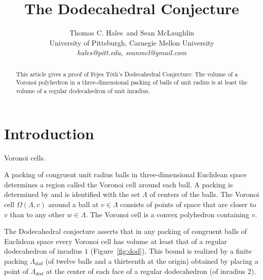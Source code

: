 \documentclass{article} %
\begin{document}
\title{The Dodecahedral Conjecture}
\author{Thomas C. Hales\ and Sean McLaughlin \\
        \normalsize{University of Pittsburgh, Carnegie Mellon University} \\
        \normalsize{\it{hales@pitt.edu, seanmcl@gmail.com}}}
\date{}
\maketitle

\begin{abstract}  
This article gives a proof of Fejes T\'oth's Dodecahedral Conjecture:
The volume of a Voronoi polyhedron in a three-dimensional packing of
balls of unit radius is at least the volume of a regular dodecahedron
of unit inradius.
\end{abstract}


\section{Introduction}

\begin{floatingfigure}{55mm}
  \begin{center}
   \end{center}
  \caption{Voronoi cells.}
  \label{fig:voronoi}
\end{floatingfigure}

A packing of congruent unit radius balls in three-dimensional
Euclidean space determines a region called the Voronoi cell around
each ball. A packing is determined by and is identified with the set
$\Lambda$ of centers of the balls. The Voronoi cell
$\Omega(\Lambda,v)$ around a ball at $v\in \Lambda$ consists of points
of space that are closer to $v$ than to any other $w\in\Lambda$. The
Voronoi cell is a convex polyhedron containing $v$.

The Dodecahedral conjecture asserts that in any packing of congruent balls of Euclidean
space every Voronoi cell has volume at least that of a regular dodecahedron
of inradius $1$ (Figure~\ref{fig:dod}).    This bound is realized by a finite 
packing $\Lambda_{dod}$
(of twelve balls and a thirteenth  at the origin) obtained
by placing a point of $\Lambda_{dod}$ at the center of each face of a regular dodecahedron (of inradius $2$).
\end{document}
